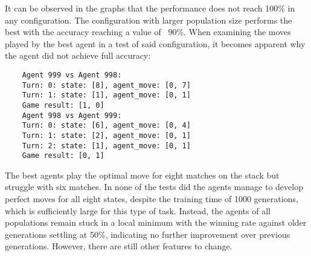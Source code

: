 \begin{figure}[H]
\begin{adjustbox}{valign=c,margin=-5mm 0pt 0pt 0pt}
\begin{minipage}{1.1\textwidth}
\begin{subfigure}[b]{0.45\textwidth}
                \begin{center}
                \end{center}
            \end{subfigure}
        \end{minipage}
    \end{adjustbox}
    \label{fig:performances-2}
\end{figure}
It can be observed in the graphs that the performance does not reach 100\% in any configuration.
The configuration with larger population size performs the best with the accuracy reaching a value of ~90\%.
When examining the moves played by the best agent in a test of said configuration, it becomes apparent why the agent did not achieve full accuracy:
\begin{verbatim}
    Agent 999 vs Agent 998:
    Turn: 0: state: [8], agent_move: [0, 7]
    Turn: 1: state: [1], agent_move: [0, 1]
    Game result: [1, 0]
    Agent 998 vs Agent 999:
    Turn: 0: state: [6], agent_move: [0, 4]
    Turn: 1: state: [2], agent_move: [0, 1]
    Turn: 2: state: [1], agent_move: [0, 1]
    Game result: [0, 1]
\end{verbatim}
The best agents play the optimal move for eight matches on the stack but struggle with six matches.
In none of the tests did the agents manage to develop perfect moves for all eight states, despite the training time of 1000 generations, which is sufficiently large for this type of task.
Instead, the agents of all populations remain stuck in a local minimum with the winning rate against older generations settling at 50\%, indicating no further improvement over previous generations.
However, there are still other features to change.

